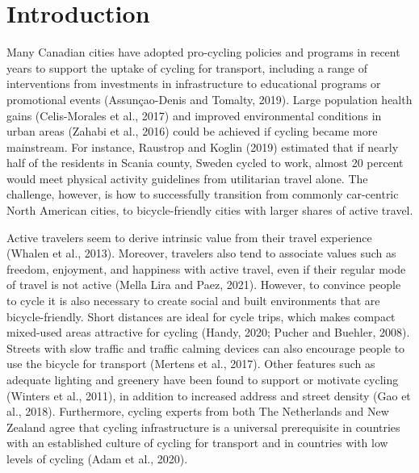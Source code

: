 \documentclass[]{elsarticle} %
\begin{document}
\newpage

\hypertarget{sec:introduction}{%
\section{Introduction}\label{sec:introduction}}

Many Canadian cities have adopted pro-cycling policies and programs in
recent years to support the uptake of cycling for transport, including a
range of interventions from investments in infrastructure to educational
programs or promotional events (Assunçao-Denis and Tomalty, 2019). Large
population health gains (Celis-Morales et al., 2017) and improved
environmental conditions in urban areas (Zahabi et al., 2016) could be
achieved if cycling became more mainstream. For instance, Raustrop and
Koglin (2019) estimated that if nearly half of the residents in Scania
county, Sweden cycled to work, almost 20 percent would meet physical
activity guidelines from utilitarian travel alone. The challenge,
however, is how to successfully transition from commonly car-centric
North American cities, to bicycle-friendly cities with larger shares of
active travel.

Active travelers seem to derive intrinsic value from their travel
experience (Whalen et al., 2013). Moreover, travelers also tend to
associate values such as freedom, enjoyment, and happiness with active
travel, even if their regular mode of travel is not active (Mella Lira
and Paez, 2021). However, to convince people to cycle it is also
necessary to create social and built environments that are
bicycle-friendly. Short distances are ideal for cycle trips, which makes
compact mixed-used areas attractive for cycling (Handy, 2020; Pucher and
Buehler, 2008). Streets with slow traffic and traffic calming devices
can also encourage people to use the bicycle for transport (Mertens et
al., 2017). Other features such as adequate lighting and greenery have
been found to support or motivate cycling (Winters et al., 2011), in
addition to increased address and street density (Gao et al., 2018).
Furthermore, cycling experts from both The Netherlands and New Zealand
agree that cycling infrastructure is a universal prerequisite in
countries with an established culture of cycling for transport and in
countries with low levels of cycling (Adam et al., 2020).
\end{document}

